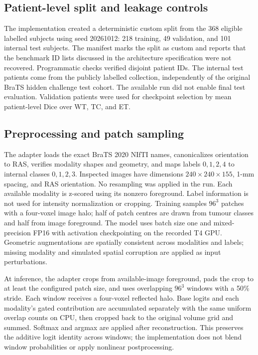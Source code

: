\documentclass[conference]{IEEEtran}
\begin{document}
\subsection{Patient-level split and leakage controls}
The implementation created a deterministic custom split from the 368 eligible labelled subjects using seed 20261012: 218 training, 49 validation, and 101 internal test subjects. The manifest marks the split as custom and reports that the benchmark ID lists discussed in the architecture specification were not recovered. Programmatic checks verified disjoint patient IDs. The internal test patients come from the publicly labelled collection, independently of the original BraTS hidden challenge test cohort. The available run did not enable final test evaluation. Validation patients were used for checkpoint selection by mean patient-level Dice over WT, TC, and ET.

\subsection{Preprocessing and patch sampling}
The adapter loads the exact BraTS 2020 NIfTI names, canonicalizes orientation to RAS, verifies modality shapes and geometry, and maps labels $0,1,2,4$ to internal classes $0,1,2,3$. Inspected images have dimensions $240\times240\times155$, 1-mm spacing, and RAS orientation. No resampling was applied in the run. Each available modality is z-scored using its nonzero foreground. Label information is not used for intensity normalization or cropping. Training samples $96^3$ patches with a four-voxel image halo; half of patch centres are drawn from tumour classes and half from image foreground. The model uses batch size one and mixed-precision FP16 with activation checkpointing on the recorded T4 GPU. Geometric augmentations are spatially consistent across modalities and labels; missing modality and simulated spatial corruption are applied as input perturbations.

At inference, the adapter crops from available-image foreground, pads the crop to at least the configured patch size, and uses overlapping $96^3$ windows with a 50\% stride. Each window receives a four-voxel reflected halo. Base logits and each modality's gated contribution are accumulated separately with the same uniform overlap counts on CPU, then cropped back to the original volume grid and summed. Softmax and argmax are applied after reconstruction. This preserves the additive logit identity across windows; the implementation does not blend window probabilities or apply nonlinear postprocessing.
\end{document}
